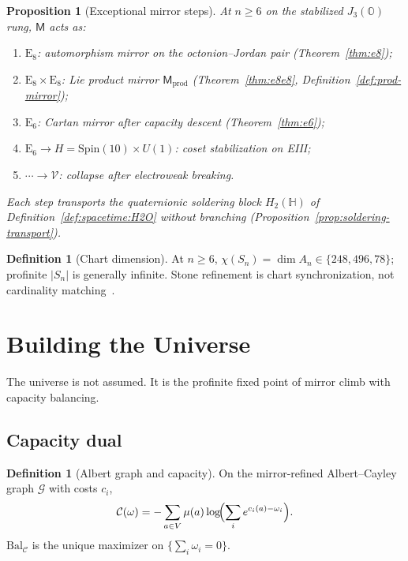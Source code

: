 \documentclass[11pt]{article}
\theoremstyle{plain}
\newtheorem{proposition}[theorem]{Proposition}
\theoremstyle{definition}
\newtheorem{definition}[theorem]{Definition}
\theoremstyle{remark}
\numberwithin{equation}{section}
\newcommand{\Quat}{\mathbb{H}}
\newcommand{\jalg}{J_3(\mathbb{O})}
\newcommand{\E}[1]{\mathrm{E}_{#1}}
\newcommand{\Spin}{\mathrm{Spin}}
\newcommand{\Void}{\mathcal{V}}
\newcommand{\Mirror}{\mathsf{M}}
\newcommand{\capacity}{\mathcal{C}}
\begin{document}
\begin{proposition}[Exceptional mirror steps]\label{prop:climb:exceptional}
At $n\geq6$ on the stabilized $\jalg$ rung, $\Mirror$ acts as:
\begin{enumerate}[label=(\roman*),leftmargin=*]
  \item $\E{8}$: automorphism mirror on the octonion--Jordan pair
    (Theorem~\ref{thm:e8});
  \item $\E{8}\times\E{8}$: Lie product mirror $\Mirror_{\mathrm{prod}}$
    (Theorem~\ref{thm:e8e8}, Definition~\ref{def:prod-mirror});
  \item $\E{6}$: Cartan mirror after capacity descent
    (Theorem~\ref{thm:e6});
  \item $\E{6}\to H=\Spin(10)\times U(1)$: coset stabilization on EIII;
  \item $\cdots\to\Void$: collapse after electroweak breaking.
\end{enumerate}
Each step transports the quaternionic soldering block $H_2(\Quat)$ of
Definition~\ref{def:spacetime:H2O} without branching
(Proposition~\ref{prop:soldering-transport}).
\end{proposition}

\begin{definition}[Chart dimension]\label{def:chart-dim}
At $n\geq6$, $\chi(S_n)=\dim A_n\in\{248,496,78\}$; profinite $|S_n|$ is
generally infinite. Stone refinement is chart synchronization, not cardinality
matching~\cite{Stone1936}.
\end{definition}%
\section{Building the Universe}
\label{sec:universe}

The universe is not assumed. It is the profinite fixed point of mirror climb
with capacity balancing.

\subsection{Capacity dual}
\label{sec:universe:capacity}

\begin{definition}[Albert graph and capacity]\label{def:capacity}
On the mirror-refined Albert--Cayley graph $\mathcal{G}$ with costs $c_i$,
\begin{equation}\label{eq:capacity}
  \capacity(\omega)=-\sum_{a\in V}\mu(a)\log\!\Bigl(\sum_i e^{c_i(a)-\omega_i}\Bigr).
\end{equation}
$\mathrm{Bal}_{\mathcal{C}}$ is the unique maximizer on $\{\sum_i\omega_i=0\}$.
\end{definition}
\end{document}
